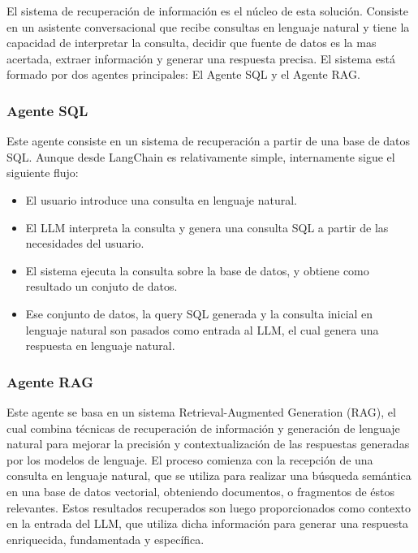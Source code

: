 El sistema de recuperación de información es el núcleo de esta solución.
Consiste en un asistente conversacional que recibe consultas en lenguaje natural y tiene la capacidad de interpretar la consulta, decidir que fuente de datos es la mas acertada, extraer información y generar una respuesta precisa.
El sistema está formado por dos agentes principales: El Agente SQL y el Agente RAG.

\subsubsection{Agente SQL}

Este agente consiste en un sistema de recuperación a partir de una base de datos SQL. Aunque desde LangChain es relativamente simple, internamente sigue el siguiente flujo:

\begin{itemize}
    \item El usuario introduce una consulta en lenguaje natural.
    \item El LLM interpreta la consulta y genera una consulta SQL a partir de las necesidades del usuario.
    \item El sistema ejecuta la consulta sobre la base de datos, y obtiene como resultado un conjuto de datos.
    \item Ese conjunto de datos, la query SQL generada y la consulta inicial en lenguaje natural son pasados como entrada al LLM, el cual genera una respuesta en lenguaje natural.
\end{itemize}



\subsubsection{Agente RAG}

Este agente se basa en un sistema Retrieval-Augmented Generation (RAG), el cual combina técnicas de recuperación de información y generación de lenguaje natural para mejorar la precisión y contextualización de las respuestas generadas por los modelos de lenguaje. 
El proceso comienza con la recepción de una consulta en lenguaje natural, que se utiliza para realizar una búsqueda semántica en una base de datos vectorial, obteniendo documentos, o fragmentos de éstos relevantes. 
Estos resultados recuperados son luego proporcionados como contexto en la entrada del LLM, que utiliza dicha información para generar una respuesta enriquecida, fundamentada y específica. 

